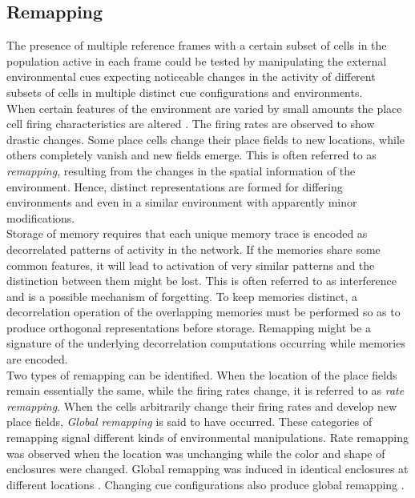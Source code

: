 \subsection{Remapping}
\label{remapping}
The presence of multiple reference frames with a certain subset of cells in the population active in each frame could be tested by manipulating the external environmental cues expecting noticeable changes in the activity of different subsets of cells in multiple distinct cue configurations and environments.\\

When certain features of the environment are varied by small amounts the place cell firing characteristics are altered \cite{Kubie1987}. The firing rates are observed to show drastic changes. Some place cells change their place fields to new locations, while others completely vanish and new fields emerge. This is often referred to as \emph{remapping}, resulting from the changes in the spatial information of the environment. Hence, distinct representations are formed for differing environments and even in a similar environment with apparently minor modifications. \\
Storage of memory requires that each unique memory trace is encoded as decorrelated patterns of activity in the network. If the memories share some common features, it will lead to activation of very similar patterns and the distinction between them might be lost. This is often referred to as interference and is a possible mechanism of forgetting. To keep memories distinct, a decorrelation operation of the overlapping memories must be performed so as to produce orthogonal representations before storage. Remapping might be a signature of the underlying decorrelation computations occurring while memories are encoded.\\
Two types of remapping can be identified. When the location of the place fields remain essentially the same, while the firing rates change, it is referred to as \emph{rate remapping}. When the cells arbitrarily change their firing rates and develop new place fields, \emph{Global remapping} is said to have occurred. These categories of remapping signal different kinds of environmental manipulations. Rate remapping was observed when the location was unchanging while the color and shape of enclosures were changed. Global remapping was induced in identical enclosures at different locations \cite{Leutgeb2005a}. Changing cue configurations also produce global remapping \cite{Leutgeb2005a}.
